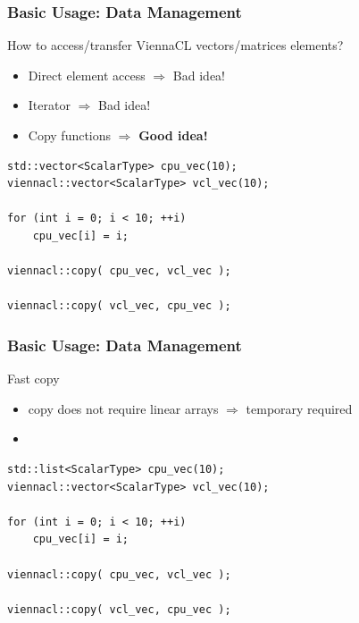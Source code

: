 \begin{frame}[fragile]
\frametitle{Basic Usage: Data Management}

\begin{block}{How to access/transfer ViennaCL vectors/matrices elements?}
  \begin{itemize}
   \item Direct element access $\Rightarrow$ Bad idea!
   \item Iterator $\Rightarrow$ Bad idea!
   \item Copy functions $\Rightarrow$ \textbf{Good idea!}
  \end{itemize}
  
  \begin{lstlisting}
std::vector<ScalarType> cpu_vec(10);
viennacl::vector<ScalarType> vcl_vec(10);

for (int i = 0; i < 10; ++i)
    cpu_vec[i] = i;
    
viennacl::copy( cpu_vec, vcl_vec );

viennacl::copy( vcl_vec, cpu_vec );
  \end{lstlisting}
\end{block}

\end{frame}



\begin{frame}[fragile]
\frametitle{Basic Usage: Data Management}

\begin{block}{Fast copy}
  \begin{itemize}
   \item copy does not require linear arrays $\Rightarrow$ temporary required
   \item 
  \end{itemize}
  
  \begin{lstlisting}
std::list<ScalarType> cpu_vec(10);
viennacl::vector<ScalarType> vcl_vec(10);

for (int i = 0; i < 10; ++i)
    cpu_vec[i] = i;
    
viennacl::copy( cpu_vec, vcl_vec );

viennacl::copy( vcl_vec, cpu_vec );
  \end{lstlisting}
\end{block}

\end{frame}



